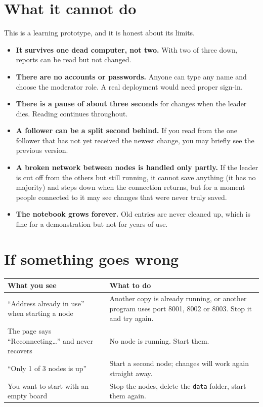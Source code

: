 \documentclass[11pt,a4paper]{article}
\begin{document}
\section{What it cannot do}
\label{sec:limits}

This is a learning prototype, and it is honest about its limits.

\begin{itemize}
\item \textbf{It survives one dead computer, not two.} With two of three down, reports can be
read but not changed.
\item \textbf{There are no accounts or passwords.} Anyone can type any name and choose the
moderator role. A real deployment would need proper sign-in.
\item \textbf{There is a pause of about three seconds} for changes when the leader dies. Reading
continues throughout.
\item \textbf{A follower can be a split second behind.} If you read from the one follower that
has not yet received the newest change, you may briefly see the previous version.
\item \textbf{A broken network between nodes is handled only partly.} If the leader is cut off
from the others but still running, it cannot save anything (it has no majority) and steps down
when the connection returns, but for a moment people connected to it may see changes that were
never truly saved.
\item \textbf{The notebook grows forever.} Old entries are never cleaned up, which is fine for a
demonstration but not for years of use.
\end{itemize}

\section{If something goes wrong}

\begin{tabular}{@{}p{}p{}@{}}
\toprule
What you see & What to do \\
\midrule
``Address already in use'' when starting a node & Another copy is already running, or another
program uses port 8001, 8002 or 8003. Stop it and try again. \\
The page says ``Reconnecting\dots'' and never recovers & No node is running. Start them. \\
``Only 1 of 3 nodes is up'' & Start a second node; changes will work again straight away. \\
You want to start with an empty board & Stop the nodes, delete the \texttt{data} folder, start
them again. \\
\bottomrule
\end{tabular}
\end{document}
